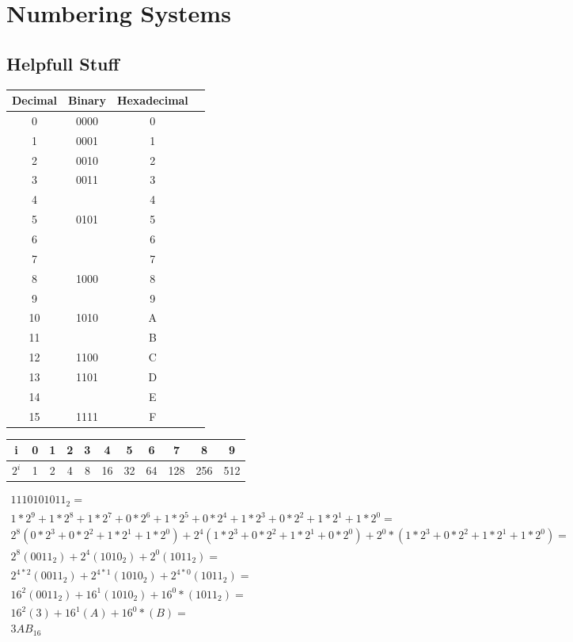 \chapter{Numbering Systems}
\graphicspath{ {./chapter01/FigWork} }

\section{Helpfull Stuff}

\begin{tabular}{|c|c|c|c|}\hline
    Decimal & Binary & Hexadecimal \\ \hline
    0    & 0000    & 0     \\ \hline
    1    & 0001    & 1     \\ \hline
    2    & 0010    & 2     \\ \hline
    3    & 0011    & 3     \\ \hline
    4    &         & 4     \\ \hline
    5    & 0101    & 5     \\ \hline
    6    &         & 6     \\ \hline
    7    &         & 7     \\ \hline
    8    & 1000    & 8     \\ \hline
    9    &         & 9     \\ \hline
    10    & 1010    & A     \\ \hline
    11    &         & B     \\ \hline
    12    & 1100    & C     \\ \hline
    13    & 1101    & D     \\ \hline
    14    &         & E     \\ \hline
    15    & 1111    & F     \\ \hline
\end{tabular}
\vspace{0.5in}

\begin{tabular}{|c|c|c|c|c|c|c|c|c|c|c|}\hline
    i    & 0 & 1 &  2 &  3 &  4 &  5 &  6 &  7  &  8  &  9  \\ \hline
    $2^i$ & 1 & 2 &  4 &  8 & 16 & 32 & 64 & 128 & 256 &  512\\ \hline
\end{tabular}
\vspace{0.5in}

{\tiny
    $
    \begin{array}{l}
        1110101011_2= \\
        1*2^9+1*2^8+1*2^7+0*2^6+1*2^5+0*2^4+1*2^3+0*2^2+1*2^1+1*2^0 = \\
        2^8(0*2^3+0*2^2+1*2^1+1*2^0) + 2^4(1*2^3+0*2^2+1*2^1+0*2^0) + 2^0*(1*2^3+0*2^2+1*2^1+1*2^0) =\\
        2^8(0011_2) + 2^4(1010_2) +  2^0(1011_2) =\\
        2^{4*2}(0011_2) + 2^{4*1}(1010_2) +  2^{4*0}(1011_2) =\\
        16^2(0011_2) + 16^1(1010_2) + 16^0*(1011_2) =\\
        16^2(3) + 16^1(A) + 16^0*(B) =\\
        3AB_{16}
    \end{array}$
}

